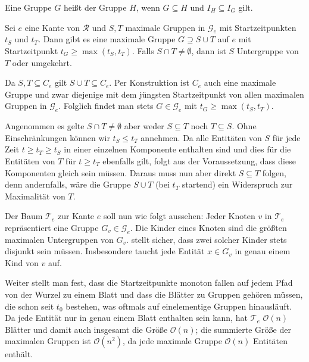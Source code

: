 \begin{definition}[{name=[Untergruppe]}]
	Eine Gruppe $G$ heißt  der Gruppe $H$, wenn $G \subseteq H$ und $I_H \subseteq I_G$ gilt.
\end{definition}

\begin{lemma}[{name={\cite[Lem.~8]{buchin2015}}},label=lem:untergruppen]
	Sei $e$ eine Kante von $\mathcal{R}$ und $S,T$ maximale Gruppen in $\mathcal{G}_e$ mit Startzeitpunkten $t_S$ und $t_T$.
	Dann gibt es eine maximale Gruppe $G \supseteq S \cup T$ auf $e$ mit Startzeitpunkt $t_G \ge \max(t_S,t_T)$.
	Falls $S \cap T \neq \emptyset$, dann ist $S$ Untergruppe von $T$ oder umgekehrt.
\end{lemma}
\begin{beweis}
	Da $S,T \subseteq C_e$ gilt $S \cup T \subseteq C_e$.
	Per Konstruktion ist $C_e$ auch eine maximale Gruppe und zwar diejenige mit dem jüngsten Startzeitpunkt von allen maximalen Gruppen in $\mathcal{G}_e$.
	Folglich findet man stets $G \in \mathcal{G}_e$ mit $t_G \ge \max(t_S,t_T)$.
	
	Angenommen es gelte $S \cap T \neq \emptyset$ aber weder $S \subseteq T$ noch $T \subseteq S$.
	Ohne Einschränkungen können wir $t_S \le t_T$ annehmen.
	Da alle Entitäten von $S$ für jede Zeit $t \ge t_T \ge t_S$ in einer einzelnen Komponente enthalten sind und dies für die Entitäten von $T$ für $t \ge t_T$ ebenfalls gilt, folgt aus der Voraussetzung, dass diese Komponenten gleich sein müssen.
	Daraus muss nun aber direkt $S \subseteq T $ folgen, denn andernfalls, wäre die Gruppe $S \cup T$ (bei $t_T$ startend) ein Widerspruch zur Maximalität von $T$.
\end{beweis}

Der Baum $\mathcal{T}_e$ zur Kante $e$ soll nun wie folgt aussehen: Jeder Knoten $v$ in $\mathcal{T}_e$ repräsentiert eine Gruppe $G_v \in \mathcal{G}_e$.
Die Kinder eines Knoten sind die größten maximalen Untergruppen von $G_v$.
 stellt sicher, dass zwei solcher Kinder stets disjunkt sein müssen.
Insbesondere taucht jede Entität $x \in G_v$ in genau einem Kind von $v$ auf.

Weiter stellt man fest, dass die Startzeitpunkte monoton fallen auf jedem Pfad von der Wurzel zu einem Blatt und dass die Blätter zu Gruppen gehören müssen, die schon seit $t_0$ bestehen, was oftmals auf einelementige Gruppen hinausläuft.
Da jede Entität nur in genau einem Blatt enthalten sein kann, hat $\mathcal{T}_e$ $\mathcal{O}(n)$ Blätter und damit auch insgesamt die Größe $\mathcal{O}(n)$; die summierte Größe der maximalen Gruppen ist $\mathcal{O}(n^2)$, da jede maximale Gruppe $\mathcal{O}(n)$ Entitäten enthält.

